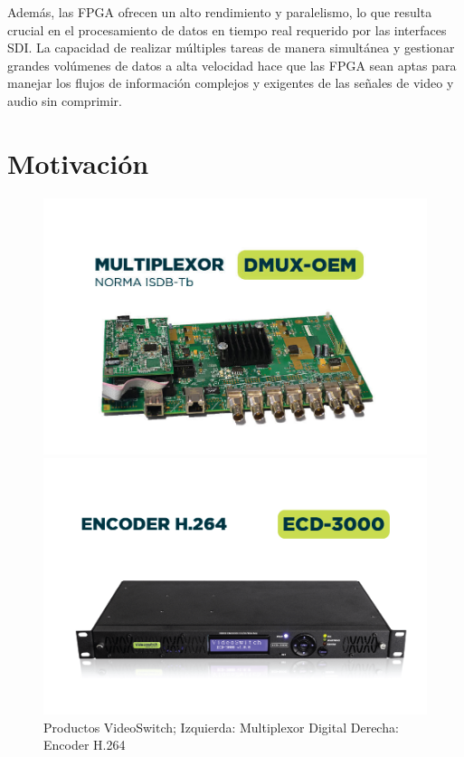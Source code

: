 Además, las FPGA ofrecen un alto rendimiento y paralelismo, lo que resulta
crucial en el procesamiento de datos en tiempo real requerido por las interfaces
SDI\@. La capacidad de realizar múltiples tareas de manera simultánea y gestionar
grandes volúmenes de datos a alta velocidad hace que las FPGA sean aptas para
manejar los flujos de información complejos y exigentes de las señales de video
y audio sin comprimir.

\section{Motivación}

\vspace{1cm}
\begin{figure}[htbp]
    \centering
    \begin{minipage}{.45\linewidth}
        \includegraphics[width=\linewidth]{./Figures/DMUX-OEM.jpg}
    \end{minipage}
    \hspace{.05\linewidth}
    \begin{minipage}{.45\linewidth}
        \includegraphics[width=\linewidth]{./Figures/ECD-3000.png}
    \end{minipage}
    \caption{Productos VideoSwitch; Izquierda: Multiplexor Digital \- Derecha: Encoder H.264}\label{fig:vs-mux-ecd}
\end{figure}
\vspace{1cm}

